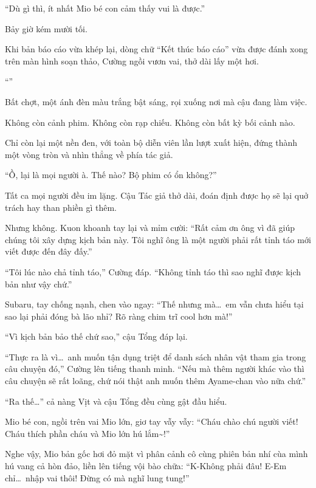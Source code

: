 \documentclass[../main.tex]{subfiles}
\begin{document}
``Dù gì thì, ít nhất Mio bé con cảm thấy vui là được.''

\ct

Bảy giờ kém mười tối.

Khi bản báo cáo vừa khép lại, dòng chữ ``Kết thúc báo cáo'' vừa được đánh xong trên màn hình soạn thảo, Cường ngồi vươn vai, thở dài lấy một hơi.

``''

Bất chợt, một ánh đèn màu trắng bật sáng, rọi xuống nơi mà cậu đang làm việc.

Không còn cảnh phim. Không còn rạp chiếu. Không còn bất kỳ bối cảnh nào.

Chỉ còn lại một nền đen,  với toàn bộ diễn viên lần lượt xuất hiện, đứng thành một vòng tròn và nhìn thẳng về phía tác giả.

``Ồ, lại là mọi người à. Thế nào? Bộ phim có ổn không?''

Tất ca mọi người đều im lặng. Cậu Tác giả thở dài, đoán định được họ sẽ lại quở trách hay than phiền gì thêm.

Nhưng không. Kuon khoanh tay lại và mỉm cười: ``Rất cảm ơn ông vì đã giúp chúng tôi xây dựng kịch bản này. Tôi nghĩ ông là một người phải rất tỉnh táo mới viết được đến đây đấy.''

``Tôi lúc nào chả tỉnh táo,'' Cường đáp. ``Không tỉnh táo thì sao nghĩ được kịch bản như vậy chứ.''

Subaru, tay chống nạnh, chen vào ngay: ``Thế nhưng mà\dots\ em vẫn chưa hiểu tại sao lại phải đóng bà lão nhỉ? Rõ ràng chim trĩ cool hơn mà!''

``Vì kịch bản bảo thế chứ sao,'' cậu Tổng đáp lại.

``Thực ra là vì\dots\ anh muốn tận dụng triệt để danh sách nhân vật tham gia trong câu chuyện đó,'' Cường lên tiếng thanh minh. ``Nếu mà thêm người khác vào thì câu chuyện sẽ rất loãng, chứ nói thật anh muốn thêm Ayame-chan vào nữa chứ.''

``Ra thế\dots'' cả nàng Vịt và cậu Tổng đều cùng gật đầu hiểu.

Mio bé con, ngồi trên vai Mio lớn, giơ tay vẫy vẫy: ``Cháu chào chú người viết! Cháu thích phần cháu và Mio lớn hú lắm\~{}!''

Nghe vậy, Mio bản gốc hơi đỏ mặt vì phân cảnh cô cùng phiên bản nhí cùa mình hú vang cả hòn đảo, liền lên tiếng vội bào chữa: ``K-Không phải đâu! E-Em chỉ\dots\ nhập vai thôi! Đừng có mà nghĩ lung tung!''
\end{document}
